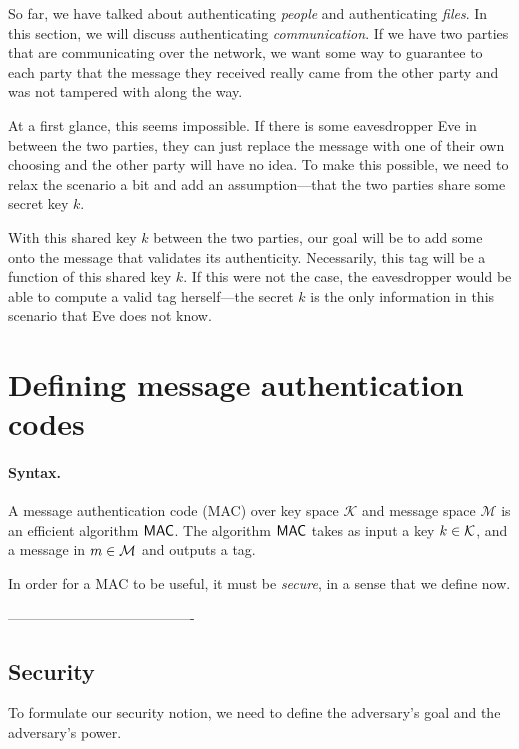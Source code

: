 \label{lec:mac}

So far, we have talked about authenticating \emph{people} and authenticating \emph{files}. In this section, we will discuss authenticating \emph{communication}. If we have two parties that are communicating over the network, we want some way to guarantee to each party that the message they received really came from the other party and was not tampered with along the way.

At a first glance, this seems impossible. If there is some eavesdropper Eve in between the two parties, they can just replace the message with one of their own choosing and the other party will have no idea. To make this possible, we need to relax the scenario a bit and add an assumption---that the two parties share some secret key $k$. 

With this shared key $k$ between the two parties, our goal will be to add some  onto the message that validates its authenticity. Necessarily, this tag will be a function of this shared key $k$. If this were not the case, the eavesdropper would be able to compute a valid tag herself---the secret $k$ is the only information in this scenario that Eve does not know.



\section{Defining message authentication codes}

\paragraph{Syntax.}
A message authentication code (MAC) 
over key space $\mathcal{K}$ and
message space $\mathcal{M}$ 
is an efficient algorithm $\mathsf{MAC}$.
The algorithm $\mathsf{MAC}$ takes as input a key $k \in \mathcal{K}$,
and a message in $m \in \mathcal{M}$ and outputs a tag. 

In order for a MAC to be useful, it must be \emph{secure},
in a sense that we define now.

----------------------------------------

\subsection{Security}
To formulate our security notion, we need to define
the adversary's goal and the adversary's power.


